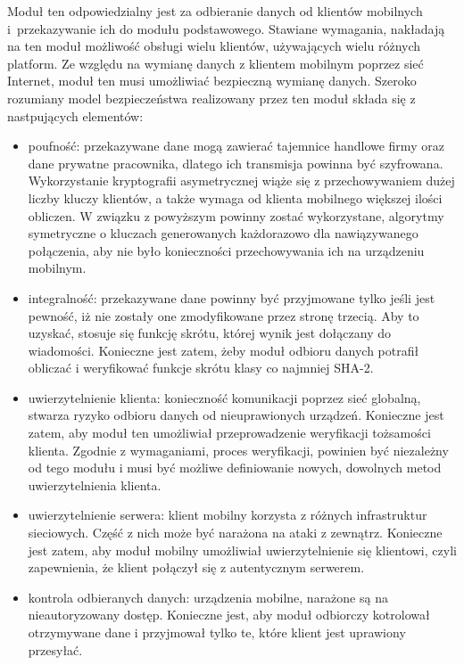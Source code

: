 Moduł ten odpowiedzialny jest za odbieranie danych od klientów
mobilnych i~przekazywanie ich do modułu podstawowego. Stawiane
wymagania, nakładają na ten moduł możliwość obsługi wielu klientów,
używających wielu różnych platform. Ze względu na wymianę danych z
klientem mobilnym poprzez sieć Internet, moduł ten musi umożliwiać
bezpieczną wymianę danych. Szeroko rozumiany model bezpieczeństwa
realizowany przez ten moduł składa się z nastpujących elementów:

\begin{itemize}
\item poufność: przekazywane dane mogą zawierać tajemnice handlowe
  firmy oraz dane prywatne pracownika, dlatego ich transmisja powinna
  być szyfrowana. Wykorzystanie kryptografii asymetrycznej wiąże się z
  przechowywaniem dużej liczby kluczy klientów, a także wymaga od
  klienta mobilnego większej ilości obliczen. W związku z powyższym
  powinny zostać wykorzystane, algorytmy symetryczne o kluczach
  generowanych każdorazowo dla nawiązywanego połączenia, aby nie było
  konieczności przechowywania ich na urządzeniu mobilnym.

\item integralność: przekazywane dane powinny być przyjmowane tylko
  jeśli jest pewność, iż nie zostały one zmodyfikowane przez stronę
  trzecią. Aby to uzyskać, stosuje się funkcję skrótu, której wynik
  jest dołączany do wiadomości. Konieczne jest zatem, żeby moduł
  odbioru danych potrafił obliczać i weryfikować funkcje skrótu klasy
  co najmniej SHA-2.

\item uwierzytelnienie klienta: konieczność komunikacji poprzez sieć
  globalną, stwarza ryzyko odbioru danych od nieuprawionych
  urządzeń. Konieczne jest zatem, aby moduł ten umożliwiał
  przeprowadzenie weryfikacji tożsamości klienta. Zgodnie z
  wymaganiami, proces weryfikacji, powinien być niezależny od tego
  modułu i musi być możliwe definiowanie nowych, dowolnych metod
  uwierzytelnienia klienta.

\item uwierzytelnienie serwera: klient mobilny korzysta z różnych
  infrastruktur sieciowych. Część z nich może być narażona na ataki z
  zewnątrz. Konieczne jest zatem, aby moduł mobilny umożliwiał
  uwierzytelnienie się klientowi, czyli zapewnienia, że klient
  połączył się z autentycznym serwerem.

\item kontrola odbieranych danych: urządzenia mobilne, narażone są na
  nieautoryzowany dostęp. Konieczne jest, aby moduł odbiorczy
  kotrolował otrzymywane dane i przyjmował tylko te, które klient jest
  uprawiony przesyłać.

\end{itemize}


